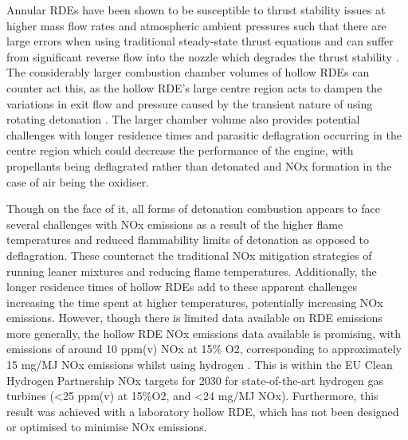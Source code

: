 \documentclass{article}
\begin{document}
Annular RDEs have been shown to be susceptible to thrust stability issues at higher mass flow rates and atmospheric ambient pressures such that there are large errors when using traditional steady-state thrust equations and can suffer from significant reverse flow into the nozzle which degrades the thrust stability \cite{Sun2018}. The considerably larger combustion chamber volumes of hollow RDEs can counter act this, as the hollow RDE’s large centre region acts to dampen the variations in exit flow and pressure caused by the transient nature of using rotating detonation \cite{Sun2019}. The larger chamber volume also provides potential challenges with longer residence times and parasitic deflagration occurring in the centre region \cite{Tang2015} which could decrease the performance of the engine, with propellants being deflagrated rather than detonated and NOx formation in the case of air being the oxidiser. 
\par

Though on the face of it, all forms of detonation combustion appears to face several challenges with NOx emissions as a result of the  higher flame temperatures and reduced flammability limits of detonation as opposed to deflagration. These counteract the traditional NOx mitigation strategies of running leaner mixtures and reducing flame temperatures. Additionally, the longer residence times of hollow RDEs add to these apparent challenges increasing the time spent at higher temperatures, potentially increasing NOx emissions. However, though there is limited data available on RDE emissions more generally, the hollow RDE NOx emissions data available is promising, with emissions of around 10 ppm(v) NOx at 15\% O2, corresponding to approximately 15 mg/MJ NOx emissions whilst using hydrogen \cite{Stoddard2017}. This is within the EU Clean Hydrogen Partnership NOx targets for 2030 for state-of-the-art hydrogen gas turbines (<25 ppm(v) at 15\%O2, and <24 mg/MJ NOx). Furthermore, this result was achieved with a laboratory hollow RDE, which has not been designed or optimised to minimise NOx emissions. 
\par
\end{document}
